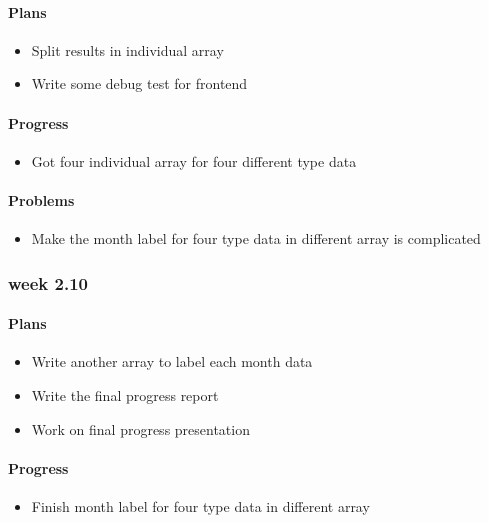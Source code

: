 \documentclass[onecolumn, draftclsnofoot,10pt, compsoc]{article}
\begin{document}
					\paragraph{Plans}
						\begin{itemize}
							\item Split results in individual array
							\item Write some debug test for frontend
						\end{itemize}
						\paragraph{Progress}
						\begin{itemize}
							\item Got four individual array for four different type data
						\end{itemize}
						\paragraph{Problems}
							\begin{itemize}
							\item Make the month label for four type data in different array is complicated
							\end{itemize}

				\subsubsection{week 2.10}
					\paragraph{Plans}
						\begin{itemize}
							\item Write another array to label each month data
							\item Write the final progress report
							\item Work on final progress presentation
						\end{itemize}
						\paragraph{Progress}
						\begin{itemize}
							\item Finish month label for four type data in different array
						\end{itemize}
\end{document}
